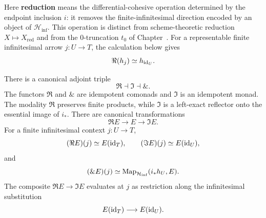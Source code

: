 \begin{remark}
\label{rem:differential-cohesive-reduction-meaning}
Here \textbf{reduction} means the differential-cohesive operation determined
by the endpoint inclusion \(i\): it removes the finite-infinitesimal direction
encoded by an object of \(\mathcal H_{\inf}\). This operation is distinct
from scheme-theoretic reduction \(X\mapsto X_{\mathrm{red}}\) and from the
\(0\)-truncation \(t_0\) of
Chapter~. For a representable finite
infinitesimal arrow \(j:U\to T\), the calculation below gives
\[
    \Re(h_j)\simeq h_{\operatorname{id}_U}.
\]
\end{remark}

\begin{theorem}
\label{thm:endpoint-cohesive-triple}
There is a canonical adjoint triple
\[
    \Re\dashv\Im\dashv\&.
\]
The functors \(\Re\) and \(\&\) are idempotent comonads and \(\Im\) is an
idempotent monad. The modality \(\Re\) preserves finite products, while
\(\Im\) is a left-exact reflector onto the essential image of \(i_*\). There
are canonical transformations
\[
    \Re E\longrightarrow E\longrightarrow\Im E.
\]
For a finite infinitesimal context \(j:U\to T\),
\[
    (\Re E)(j)\simeq E(\operatorname{id}_T),
    \qquad
    (\Im E)(j)\simeq E(\operatorname{id}_U),
\]
and
\[
    (\&E)(j)
    \simeq
    \operatorname{Map}_{\mathcal H_{\inf}}(i_*h_U,E).
\]
The composite \(\Re E\to\Im E\) evaluates at \(j\) as restriction along the
infinitesimal substitution
\[
    E(\operatorname{id}_T)\longrightarrow E(\operatorname{id}_U).
\]
\end{theorem}

